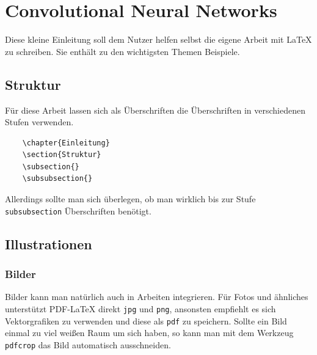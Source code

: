 \chapter{Convolutional Neural Networks}

Diese kleine Einleitung soll dem Nutzer helfen selbst die eigene Arbeit mit \LaTeX{} zu schreiben. Sie enthält zu den wichtigsten Themen Beispiele.


\section{Struktur}

Für diese Arbeit lassen sich als Überschriften die Überschriften in verschiedenen Stufen verwenden.

\begin{verbatim}
    \chapter{Einleitung}
    \section{Struktur}
    \subsection{}
    \subsubsection{}
\end{verbatim}

Allerdings sollte man sich überlegen, ob man wirklich bis zur Stufe \verb|subsubsection| Überschriften benötigt.



\section{Illustrationen}


\subsection{Bilder}

Bilder kann man natürlich auch in Arbeiten integrieren. Für Fotos und ähnliches unterstützt PDF-\LaTeX{} direkt \verb|jpg| und \verb|png|, ansonsten empfiehlt es sich Vektorgrafiken zu verwenden und diese als \verb|pdf| zu speichern. Sollte ein Bild einmal zu viel weißen Raum um sich haben, so kann man mit dem Werkzeug \verb|pdfcrop| das Bild automatisch ausschneiden\cite{pdfcrop}.

